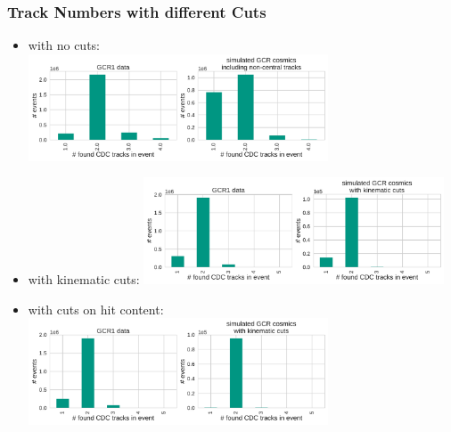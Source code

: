 \documentclass[18pt]{beamer}
\begin{document}
  \begin{frame}[allowframebreaks]
    \frametitle{Track Numbers with different Cuts}
    \begin{itemize}
    \item with no cuts:\\
      \includegraphics[width=0.7\textwidth]{figures/nfound_tracks_nocuts.pdf}
    \item with kinematic cuts:
      \includegraphics[width=0.7\textwidth]{figures/nfound_tracks_kincuts.pdf}\\      
    \item with cuts on hit content:\\
      \includegraphics[width=0.7\textwidth]{figures/nfound_tracks_allcuts.pdf}
    \end{itemize}
  \end{frame}
\end{document}
